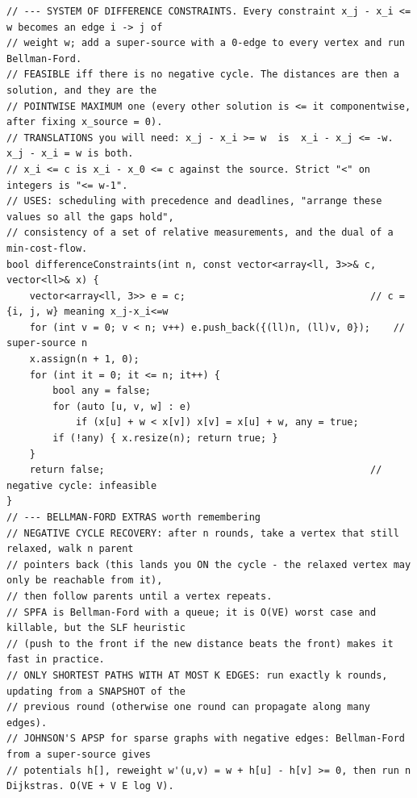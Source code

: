 \documentclass[9pt,a4paper,twocolumn]{extarticle}
\begin{document}
\begin{lstlisting}
// --- SYSTEM OF DIFFERENCE CONSTRAINTS. Every constraint x_j - x_i <= w becomes an edge i -> j of
// weight w; add a super-source with a 0-edge to every vertex and run Bellman-Ford.
// FEASIBLE iff there is no negative cycle. The distances are then a solution, and they are the
// POINTWISE MAXIMUM one (every other solution is <= it componentwise, after fixing x_source = 0).
// TRANSLATIONS you will need: x_j - x_i >= w  is  x_i - x_j <= -w.  x_j - x_i = w is both.
// x_i <= c is x_i - x_0 <= c against the source. Strict "<" on integers is "<= w-1".
// USES: scheduling with precedence and deadlines, "arrange these values so all the gaps hold",
// consistency of a set of relative measurements, and the dual of a min-cost-flow.
bool differenceConstraints(int n, const vector<array<ll, 3>>& c, vector<ll>& x) {
    vector<array<ll, 3>> e = c;                                // c = {i, j, w} meaning x_j-x_i<=w
    for (int v = 0; v < n; v++) e.push_back({(ll)n, (ll)v, 0});    // super-source n
    x.assign(n + 1, 0);
    for (int it = 0; it <= n; it++) {
        bool any = false;
        for (auto [u, v, w] : e)
            if (x[u] + w < x[v]) x[v] = x[u] + w, any = true;
        if (!any) { x.resize(n); return true; }
    }
    return false;                                              // negative cycle: infeasible
}
// --- BELLMAN-FORD EXTRAS worth remembering
// NEGATIVE CYCLE RECOVERY: after n rounds, take a vertex that still relaxed, walk n parent
// pointers back (this lands you ON the cycle - the relaxed vertex may only be reachable from it),
// then follow parents until a vertex repeats.
// SPFA is Bellman-Ford with a queue; it is O(VE) worst case and killable, but the SLF heuristic
// (push to the front if the new distance beats the front) makes it fast in practice.
// ONLY SHORTEST PATHS WITH AT MOST K EDGES: run exactly k rounds, updating from a SNAPSHOT of the
// previous round (otherwise one round can propagate along many edges).
// JOHNSON'S APSP for sparse graphs with negative edges: Bellman-Ford from a super-source gives
// potentials h[], reweight w'(u,v) = w + h[u] - h[v] >= 0, then run n Dijkstras. O(VE + V E log V).
\end{lstlisting}

\filbreak
\end{document}
